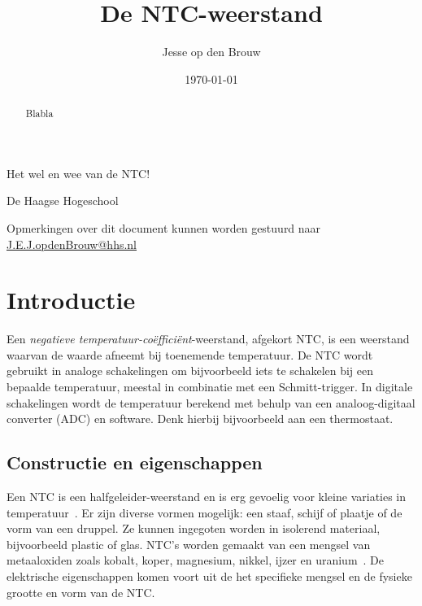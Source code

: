 \documentclass[12pt,a4paper,final,twoside,fleqn]{article}
\author{Jesse op den Brouw}
\title{De NTC-weerstand}
\date{\today}
\makeatletter
\def\maketitle{%
  \null
  \thispagestyle{empty}%
  \vskip 3cm
  \begin{center}\leavevmode
    {\LARGE \@title\par}%
    {\large \subtitle\par}%
    \vskip 1cm
    {\large \@author\par}%
    \vskip 0.03cm
    {\large De Haagse Hogeschool\par}%
    \vskip 0.03cm
    {\large \@date\par}%
  \end{center}%
  \vfill
  \null
}
\newcommand{\subtitle}{Het wel en wee van de NTC!}
\makeatother
\begin{document}
\raggedbottom

\maketitle
\begin{abstract}
\noindent
Blabla
\end{abstract}
\vspace*{2cm}

\clearpage
\tableofcontents
\clearpage
\listoffigures
\vspace{1cm}
\lstlistoflistings
\vfill
{\small
Opmerkingen over dit document kunnen worden gestuurd naar
\href{mailto:J.E.J.opdenBrouw@hhs.nl}{J.E.J.opdenBrouw@hhs.nl}
}
\clearpage


\section{Introductie}
Een \textsl{negatieve temperatuur-co\"effici\"ent}-weerstand, afgekort NTC,
is een weerstand waarvan de waarde afneemt bij toenemende temperatuur. De
NTC wordt gebruikt in analoge schakelingen om bijvoorbeeld iets te schakelen
bij een bepaalde temperatuur, meestal in combinatie met een Schmitt-trigger.
In digitale schakelingen wordt de temperatuur berekend met behulp van een
analoog-digitaal converter (ADC) en software. Denk hierbij bijvoorbeeld aan
een thermostaat. 
\subsection{Constructie en eigenschappen}
Een NTC is een halfgeleider-weerstand en is erg gevoelig voor kleine variaties
in temperatuur~\cite{jespersen1982thermal}. Er zijn diverse vormen mogelijk:
een staaf, schijf of plaatje of de vorm van een druppel. Ze kunnen ingegoten
worden in isolerend materiaal, bijvoorbeeld plastic of glas.
NTC's worden gemaakt van een mengsel van metaaloxiden zoals kobalt, koper,
magnesium, nikkel, ijzer en uranium~\cite{bakshi2009basic}. De elektrische
eigenschappen komen voort uit de het specifieke mengsel en de fysieke grootte
en vorm van de NTC.
\end{document}
